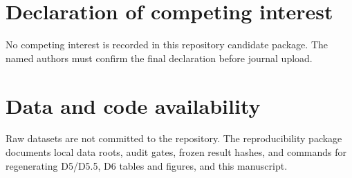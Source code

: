 \documentclass[preprint,review,12pt]{elsarticle}
\begin{document}
\section*{Declaration of competing interest}
No competing interest is recorded in this repository candidate package. The named
authors must confirm the final declaration before journal upload.

\section*{Data and code availability}
Raw datasets are not committed to the repository. The reproducibility package
documents local data roots, audit gates, frozen result hashes, and commands for
regenerating D5/D5.5, D6 tables and figures, and this manuscript.



\end{document}
